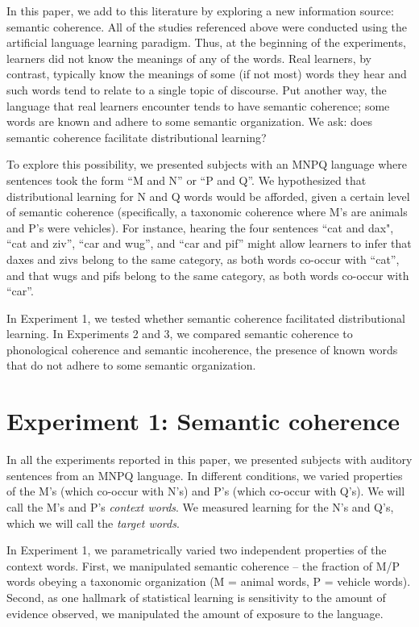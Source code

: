 \documentclass[man,floatsintext]{apa6}
\begin{document}
In this paper, we add to this literature by exploring a new information source: semantic coherence. All of the studies referenced above were conducted using the artificial language learning paradigm. Thus, at the beginning of the experiments, learners did not know the meanings of any of the words. Real learners, by contrast, typically know the meanings of some (if not most) words they hear and such words tend to relate to a single topic of discourse. Put another way, the language that real learners encounter tends to have semantic coherence; some words are known and adhere to some semantic organization. We ask: does semantic coherence facilitate distributional learning?

To explore this possibility, we presented subjects with an MNPQ language where sentences took the form ``M and N'' or ``P and Q''. We hypothesized that distributional learning for N and Q words would be afforded, given a certain level of semantic coherence (specifically, a taxonomic coherence where M's are animals and P's were vehicles). For instance, hearing the four sentences ``cat and dax", ``cat and ziv'', ``car and wug'', and ``car and pif'' might allow learners to infer that daxes and zivs belong to the same category, as both words co-occur with ``cat'', and that wugs and pifs belong to the same category, as both words co-occur with ``car''.

In Experiment 1, we tested whether semantic coherence facilitated distributional learning. In Experiments 2 and 3, we compared semantic coherence to phonological coherence and semantic incoherence, the presence of known words that do not adhere to some semantic organization.

\section{Experiment 1: Semantic coherence}

In all the experiments reported in this paper, we presented subjects with auditory sentences from an MNPQ language. In different conditions, we varied properties of the M's (which co-occur with N's) and P's (which co-occur with Q's). We will call the M's and P's \emph{context words}. We measured learning for the N's and Q's, which we will call the \emph{target words}.

In Experiment 1, we parametrically varied two independent properties of the context words. First, we manipulated semantic coherence -- the fraction of M/P words obeying a taxonomic organization (M = animal words, P = vehicle words). Second, as one hallmark of statistical learning is sensitivity to the amount of evidence observed, we manipulated the amount of exposure to the language.
\end{document}
